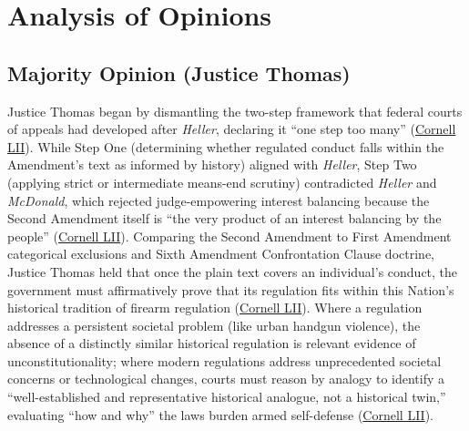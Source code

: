 \documentclass[12pt]{article}
\begin{document}
\section{Analysis of Opinions}

\subsection{Majority Opinion (Justice Thomas)}

Justice Thomas began by dismantling the two-step framework that federal courts of appeals had developed after \textit{Heller}, declaring it ``one step too many'' (\href{https://www.law.cornell.edu/supremecourt/text/20-843}{Cornell LII}). While Step One (determining whether regulated conduct falls within the Amendment's text as informed by history) aligned with \textit{Heller}, Step Two (applying strict or intermediate means-end scrutiny) contradicted \textit{Heller} and \textit{McDonald}, which rejected judge-empowering interest balancing because the Second Amendment itself is ``the very product of an interest balancing by the people'' (\href{https://www.law.cornell.edu/supremecourt/text/20-843}{Cornell LII}). Comparing the Second Amendment to First Amendment categorical exclusions and Sixth Amendment Confrontation Clause doctrine, Justice Thomas held that once the plain text covers an individual's conduct, the government must affirmatively prove that its regulation fits within this Nation's historical tradition of firearm regulation (\href{https://www.law.cornell.edu/supremecourt/text/20-843}{Cornell LII}). Where a regulation addresses a persistent societal problem (like urban handgun violence), the absence of a distinctly similar historical regulation is relevant evidence of unconstitutionality; where modern regulations address unprecedented societal concerns or technological changes, courts must reason by analogy to identify a ``well-established and representative historical analogue, not a historical twin,'' evaluating ``how and why'' the laws burden armed self-defense (\href{https://www.law.cornell.edu/supremecourt/text/20-843}{Cornell LII}).
\end{document}
